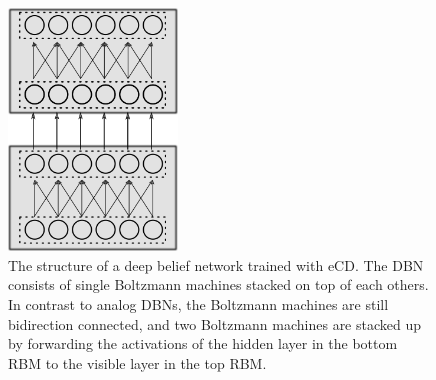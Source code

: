 \begin{figure}
	\centering
    	\includegraphics[width=0.4\textwidth]{imgs/spike_dbn.png} 
    \caption{The structure of a deep belief network trained with eCD. The DBN consists of single Boltzmann machines stacked on top of each others. In contrast to analog DBNs, the Boltzmann machines are still bidirection connected, and two Boltzmann machines are stacked up by forwarding the activations of the hidden layer in the bottom RBM to the visible layer in the top RBM.}
	\label{fig:spikedbn}
\end{figure}


